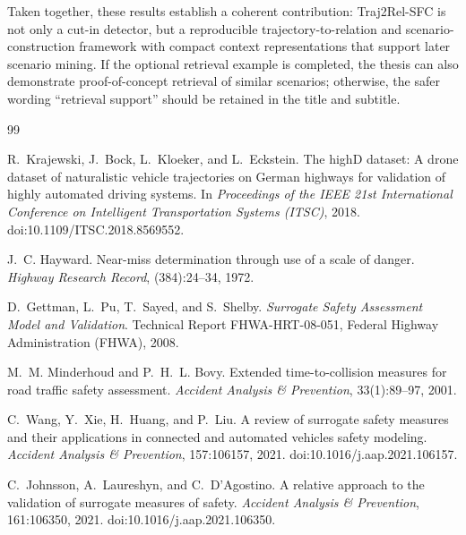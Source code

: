 \documentclass[12pt,a4paper,twoside,openright]{report}
\newcommand{\FrameworkName}{Traj2Rel-SFC}
\begin{document}
    Taken together, these results establish a coherent contribution: \FrameworkName{} is not only a cut-in detector, but a reproducible trajectory-to-relation and scenario-construction framework with compact context representations that support later scenario mining. If the optional retrieval example is completed, the thesis can also demonstrate proof-of-concept retrieval of similar scenarios; otherwise, the safer wording ``retrieval support'' should be retained in the title and subtitle.

    \cleardoublepage
    \begin{thebibliography}{99}

        R.~Krajewski, J.~Bock, L.~Kloeker, and L.~Eckstein.
        \newblock The highD dataset: A drone dataset of naturalistic vehicle trajectories on German highways for validation of highly automated driving systems.
        \newblock In \emph{Proceedings of the IEEE 21st International Conference on Intelligent Transportation Systems (ITSC)}, 2018.
        \newblock doi:10.1109/ITSC.2018.8569552.

        J.~C. Hayward.
        \newblock Near-miss determination through use of a scale of danger.
        \newblock \emph{Highway Research Record}, (384):24--34, 1972.

        D.~Gettman, L.~Pu, T.~Sayed, and S.~Shelby.
        \newblock \emph{Surrogate Safety Assessment Model and Validation}.
        \newblock Technical Report FHWA-HRT-08-051, Federal Highway Administration (FHWA), 2008.

        M.~M. Minderhoud and P.~H.~L. Bovy.
        \newblock Extended time-to-collision measures for road traffic safety assessment.
        \newblock \emph{Accident Analysis \& Prevention}, 33(1):89--97, 2001.

        C.~Wang, Y.~Xie, H.~Huang, and P.~Liu.
        \newblock A review of surrogate safety measures and their applications in connected and automated vehicles safety modeling.
        \newblock \emph{Accident Analysis \& Prevention}, 157:106157, 2021.
        \newblock doi:10.1016/j.aap.2021.106157.

        C.~Johnsson, A.~Laureshyn, and C.~D'Agostino.
        \newblock A relative approach to the validation of surrogate measures of safety.
        \newblock \emph{Accident Analysis \& Prevention}, 161:106350, 2021.
        \newblock doi:10.1016/j.aap.2021.106350.


\end{thebibliography}
\end{document}
